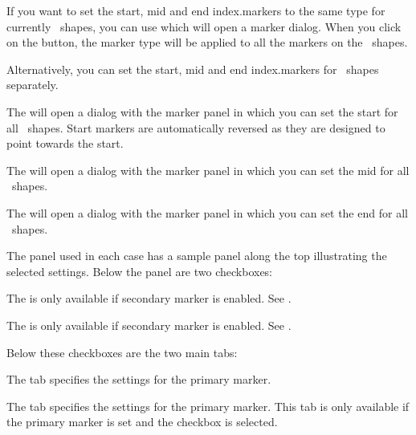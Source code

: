 
If you want to set the start, mid and end \glspl{index.marker} to
the same type for currently \selected\ shapes, you can use
 which will open a marker dialog.
When you click on the  button, the marker type
will be applied to all the markers on the \selected\ shapes.

Alternatively, you can set the start, mid and end
\glspl{index.marker} for \selected\ shapes separately.


The  will open a dialog with the
marker panel in which you can set the start  for
all \selected\ shapes. Start markers are automatically reversed as
they are designed to point towards the start.


The  will open a dialog with the
marker panel in which you can set the mid  for
all \selected\ shapes.


The  will open a dialog with the
marker panel in which you can set the end  for
all \selected\ shapes.

The  panel used in each case has a sample panel along the top
illustrating the selected settings. Below the panel are two
checkboxes:


The  is only available if secondary marker
is enabled. See .


The  is only available if secondary marker
is enabled. See .

Below these checkboxes are the two main tabs:


The  tab specifies the settings for the
primary marker.


The  tab specifies the settings for the
primary marker. This tab is only available if the primary marker is
set and the  checkbox is selected.

